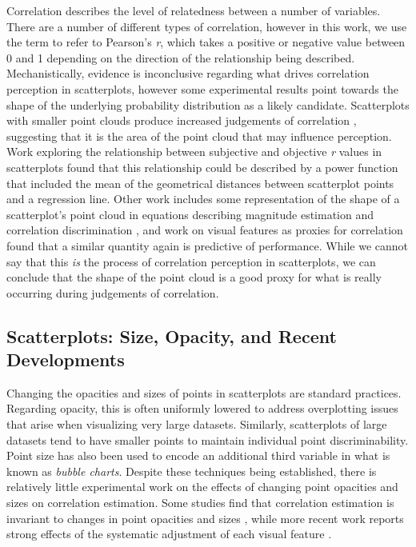 \documentclass[manuscript,screen,review]{acmart}
\begin{document}
Correlation describes the level of relatedness between a number of
variables. There are a number of different types of correlation, however
in this work, we use the term to refer to Pearson's \emph{r}, which
takes a positive or negative value between 0 and 1 depending on the
direction of the relationship being described. Mechanistically, evidence
is inconclusive regarding what drives correlation perception in
scatterplots, however some experimental results point towards the shape
of the underlying probability distribution as a likely candidate.
Scatterplots with smaller point clouds produce increased judgements of
correlation \citep{cleveland_1982}, suggesting that it is the area of
the point cloud that may influence perception. Work exploring the
relationship between subjective and objective \emph{r} values in
scatterplots found that this relationship could be described by a power
function that included the mean of the geometrical distances between
scatterplot points and a regression line. Other work includes some
representation of the shape of a scatterplot's point cloud in equations
describing magnitude estimation and correlation discrimination
\citep{meyer_1997, rensink_2017}, and work on visual features as proxies
for correlation found that a similar quantity again is predictive of
performance. While we cannot say that this \emph{is} the process of
correlation perception in scatterplots, we can conclude that the shape
of the point cloud is a good proxy for what is really occurring during
judgements of correlation.

\subsection{Scatterplots: Size, Opacity, and Recent
Developments}\label{sec-scatterplots}

Changing the opacities and sizes of points in scatterplots are standard
practices. Regarding opacity, this is often uniformly lowered to address
overplotting \citep{matejka_2015} issues that arise when visualizing
very large datasets. Similarly, scatterplots of large datasets tend to
have smaller points to maintain individual point discriminability. Point
size has also been used to encode an additional third variable in what
is known as \emph{bubble charts}. Despite these techniques being
established, there is relatively little experimental work on the effects
of changing point opacities and sizes on correlation estimation. Some
studies find that correlation estimation is invariant to changes in
point opacities and sizes \citep{rensink_2014, rensink_2017}, while more
recent work reports strong effects of the systematic adjustment of each
visual feature \citep{strain_2023, strain_2023b, strain_2024}.
\end{document}

